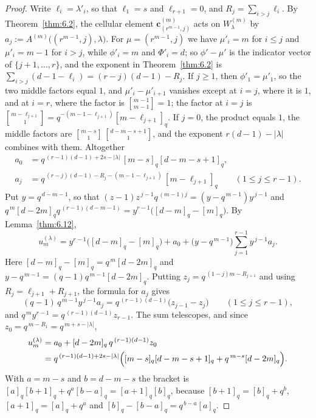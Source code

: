 \documentclass[11pt]{article}
\numberwithin{equation}{section}
\theoremstyle{plain}
\theoremstyle{definition}
\begin{document}
\begin{proof}
Write $\ell_i=\lambda'_i$, so that $\ell_1=s$ and $\ell_{r+1}=0$, and
$R_j=\sum_{i>j}\ell_i$. By Theorem~\ref{thm:6.2}, the cellular element
$\mathbf c^{(m)}_{(r^{m-1},j)}$ acts on $W^{(m)}_\lambda$ by
$a_j:=A^{(m)}\bigl((r^{m-1},j),\lambda\bigr)$. For $\mu=(r^{m-1},j)$ we have $\mu'_i=m$
for $i\le j$ and $\mu'_i=m-1$ for $i>j$, while $\phi'_i=m$ and $\Phi'_i=d$; so
$\phi'-\mu'$ is the indicator vector of $\{j+1,\dots,r\}$, and the exponent in
Theorem~\ref{thm:6.2} is $\sum_{i>j}(d-1-\ell_i)=(r-j)(d-1)-R_j$. If $j\ge1$, then
$\phi'_1=\mu'_1$, so the two middle factors equal $1$, and $\mu'_i-\mu'_{i+1}$ vanishes
except at $i=j$, where it is $1$, and at $i=r$, where the factor is $\genfrac{[}{]}{0pt}{}{m-1}{m-1}=1$; the
factor at $i=j$ is $\genfrac{[}{]}{0pt}{}{m-\ell_{j+1}}{1}=q^{-(m-1-\ell_{j+1})}[m-\ell_{j+1}]_q$. If $j=0$,
the product equals $1$, the middle factors are $\genfrac{[}{]}{0pt}{}{m-s}{1}\,\genfrac{[}{]}{0pt}{}{d-m-s+1}{1}$, and the
exponent $r(d-1)-|\lambda|$ combines with them. Altogether
\[
\begin{aligned}
a_0&=q^{\,(r-1)(d-1)+2s-|\lambda|}\,[m-s]_q[d-m-s+1]_q,\\
a_j&=q^{\,(r-j)(d-1)-R_j-(m-1-\ell_{j+1})}\,[m-\ell_{j+1}]_q\qquad(1\le j\le r-1).
\end{aligned}
\]
Put $y=q^{\,d-m-1}$, so that $(z-1)z^{\,j-1}q^{\,(m-1)j}=(y-q^{\,m-1})y^{\,j-1}$ and
$q^{\,m}[d-2m]_qq^{\,(r-1)(d-m-1)}=y^{r-1}\bigl([d-m]_q-[m]_q\bigr)$. By
Lemma~\ref{thm:6.12},
\[
u^{(\lambda)}_m
=y^{r-1}\bigl([d-m]_q-[m]_q\bigr)+a_0+\bigl(y-q^{\,m-1}\bigr)\sum_{j=1}^{r-1}
y^{\,j-1}a_j .
\]
Here $[d-m]_q-[m]_q=q^{\,m}[d-2m]_q$ and $y-q^{\,m-1}=(q-1)q^{\,m-1}[d-2m]_q$.
Putting $z_j=q^{\,(1-j)m-R_{j+1}}$ and using $R_j=\ell_{j+1}+R_{j+1}$, the formula for
$a_j$ gives
\[
(q-1)\,q^{\,m-1}y^{\,j-1}a_j=q^{\,(r-1)(d-1)}\bigl(z_{j-1}-z_j\bigr)\qquad(1\le j\le r-1),
\]
and $q^{\,m}y^{r-1}=q^{\,(r-1)(d-1)}z_{r-1}$. The sum telescopes, and since
$z_0=q^{\,m-R_1}=q^{\,m+s-|\lambda|}$,
\[
\begin{aligned}
u^{(\lambda)}_m&=a_0+[d-2m]_q\,q^{\,(r-1)(d-1)}z_0\\
&=q^{\,(r-1)(d-1)+2s-|\lambda|}\Bigl([m-s]_q[d-m-s+1]_q+q^{\,m-s}[d-2m]_q\Bigr).
\end{aligned}
\]
With $a=m-s$ and $b=d-m-s$ the bracket is $[a]_q[b+1]_q+q^{a}[b-a]_q=[a+1]_q[b]_q$, because
$[b+1]_q=[b]_q+q^{b}$, $[a+1]_q=[a]_q+q^{a}$ and $[b]_q-[b-a]_q=q^{\,b-a}[a]_q$.
\end{proof}
\end{document}
